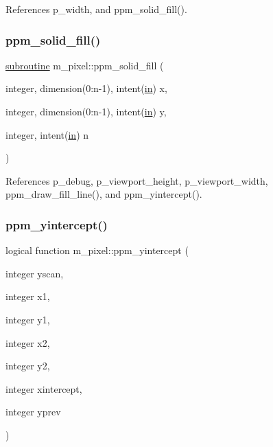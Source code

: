 References p\+\_\+width, and ppm\+\_\+solid\+\_\+fill().

\mbox{\label{namespacem__pixel_aedaf33a27e9899da22c2497aff2af903}} 
\subsubsection{\texorpdfstring{ppm\+\_\+solid\+\_\+fill()}{ppm\_solid\_fill()}}
{\footnotesize\ttfamily \hyperlink{M__stopwatch_83_8txt_acfbcff50169d691ff02d4a123ed70482}{subroutine} m\+\_\+pixel\+::ppm\+\_\+solid\+\_\+fill (\begin{DoxyParamCaption}\item[{integer, dimension(0\+:n-\/1), intent(\hyperlink{M__journal_83_8txt_afce72651d1eed785a2132bee863b2f38}{in})}]{x,  }\item[{integer, dimension(0\+:n-\/1), intent(\hyperlink{M__journal_83_8txt_afce72651d1eed785a2132bee863b2f38}{in})}]{y,  }\item[{integer, intent(\hyperlink{M__journal_83_8txt_afce72651d1eed785a2132bee863b2f38}{in})}]{n }\end{DoxyParamCaption})\hspace{0.3cm}{\ttfamily [private]}}



References p\+\_\+debug, p\+\_\+viewport\+\_\+height, p\+\_\+viewport\+\_\+width, ppm\+\_\+draw\+\_\+fill\+\_\+line(), and ppm\+\_\+yintercept().

\mbox{\label{namespacem__pixel_a4924b3a5033acb74a4f4df60a4ba21eb}} 
\subsubsection{\texorpdfstring{ppm\+\_\+yintercept()}{ppm\_yintercept()}}
{\footnotesize\ttfamily logical function m\+\_\+pixel\+::ppm\+\_\+yintercept (\begin{DoxyParamCaption}\item[{integer}]{yscan,  }\item[{integer}]{x1,  }\item[{integer}]{y1,  }\item[{integer}]{x2,  }\item[{integer}]{y2,  }\item[{integer}]{xintercept,  }\item[{integer}]{yprev }\end{DoxyParamCaption})\hspace{0.3cm}{\ttfamily [private]}}



